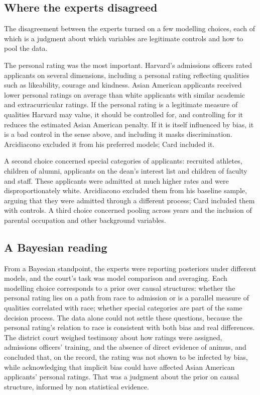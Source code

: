 \subsection{Where the experts disagreed}

The disagreement between the experts turned on a few modelling choices, each of which is a judgment about which variables are legitimate controls and how to pool the data.

The personal rating was the most important. Harvard's admissions officers rated applicants on several dimensions, including a personal rating reflecting qualities such as likeability, courage and kindness. Asian American applicants received lower personal ratings on average than white applicants with similar academic and extracurricular ratings. If the personal rating is a legitimate measure of qualities Harvard may value, it should be controlled for, and controlling for it reduces the estimated Asian American penalty. If it is itself influenced by bias, it is a bad control in the sense above, and including it masks discrimination. Arcidiacono excluded it from his preferred models; Card included it.

A second choice concerned special categories of applicants: recruited athletes, children of alumni, applicants on the dean's interest list and children of faculty and staff. These applicants were admitted at much higher rates and were disproportionately white. Arcidiacono excluded them from his baseline sample, arguing that they were admitted through a different process; Card included them with controls. A third choice concerned pooling across years and the inclusion of parental occupation and other background variables.

\subsection{A Bayesian reading}

From a Bayesian standpoint, the experts were reporting posteriors under different models, and the court's task was model comparison and averaging. Each modelling choice corresponds to a prior over causal structures: whether the personal rating lies on a path from race to admission or is a parallel measure of qualities correlated with race; whether special categories are part of the same decision process. The data alone could not settle these questions, because the personal rating's relation to race is consistent with both bias and real differences. The district court weighed testimony about how ratings were assigned, admissions officers' training, and the absence of direct evidence of animus, and concluded that, on the record, the rating was not shown to be infected by bias, while acknowledging that implicit bias could have affected Asian American applicants' personal ratings. That was a judgment about the prior on causal structure, informed by non statistical evidence.

